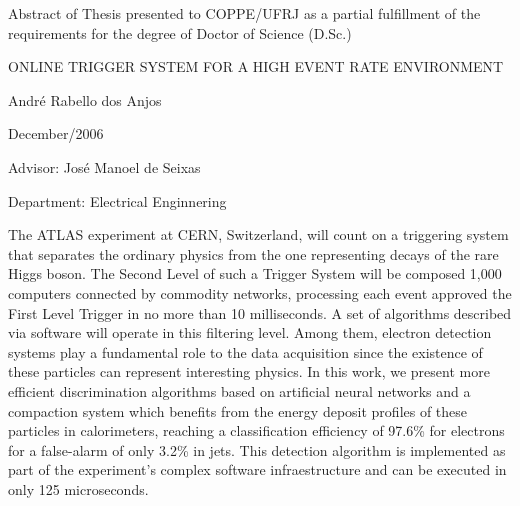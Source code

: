 \clearpage

\noindent
Abstract of Thesis presented to COPPE/UFRJ as a partial fulfillment of the
\linebreak requirements for the degree of Doctor of Science (D.Sc.)

\vspace{1.5cm}

\begin{center}
ONLINE TRIGGER SYSTEM FOR A HIGH EVENT RATE ENVIRONMENT 
\vspace{1cm}

André Rabello dos Anjos
\vspace{1cm}

December/2006
\end{center}
\vspace{2cm}

\noindent
Advisor: José Manoel de Seixas
\vspace{2cm}

\noindent
Department: Electrical Enginnering
\vspace{2cm}

\noindent \begin{summary}{1.2}
\hspace{0.8cm}The ATLAS experiment at CERN, Switzerland, will count on a
triggering system that separates the ordinary physics from the one
representing decays of the rare Higgs boson. The Second Level of such a Trigger
System will be composed 1,000 computers connected by commodity networks,
processing each event approved the First Level Trigger in no more than 10
milliseconds. A set of algorithms described via software will operate in this
filtering level. Among them, electron detection systems play a fundamental
role to the data acquisition since the existence of these particles can
represent interesting physics. In this work, we present more efficient
discrimination algorithms based on artificial neural networks and a compaction
system which benefits from the energy deposit profiles of these particles in
calorimeters, reaching a classification efficiency of 97.6\% for electrons for
a false-alarm of only 3.2\% in jets. This detection algorithm is implemented
as part of the experiment's complex software infraestructure and can be
executed in only 125 microseconds.
\end{summary}
